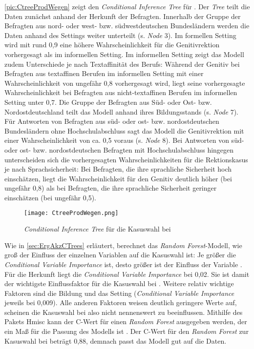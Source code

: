 \autoref{pic:CtreeProdWegen} zeigt den \textit{Conditional Inference Tree} für \wegen. 
Der \textit{Tree} teilt die Daten zunächst anhand der Herkunft der Befragten. 
Innerhalb der Gruppe der Befragten aus nord- oder west- bzw. südwestdeutschen Bundesländern werden die Daten anhand des Settings weiter unterteilt (s. \textit{Node} 3). 
Im formellen Setting wird mit rund 0,9 eine höhere Wahrscheinlichkeit für die Genitivrektion vorhergesagt als im informellen Setting. 
Im informellen Setting zeigt das Modell zudem Unterschiede je nach Textaffinität des Berufs:
Während der Genitiv bei Befragten aus textaffinen Berufen im informellen Setting mit einer Wahrscheinlichkeit von ungefähr 0,8 vorhergesagt wird, liegt seine vorhergesagte Wahrscheinlichkeit bei Befragten aus nicht-textaffinen Berufen im informellen Setting unter 0,7. 
Die Gruppe der Befragten aus Süd- oder Ost- bzw. Nordostdeutschland teilt das Modell anhand ihres Bildungsstands (s. \textit{Node} 7). 
Für Antworten von Befragten aus süd- oder ost- bzw. nordostdeutschen Bundesländern ohne Hochschulabschluss sagt das Modell die Genitivrektion mit einer Wahrscheinlichkeit von ca. 0,5 voraus (s. \textit{Node} 8). 
Bei Antworten von süd- oder ost- bzw. nordostdeutschen Befragten mit Hochschulabschluss hingegen unterscheiden sich die vorhergesagten Wahrscheinlichkeiten für die Rektionskasus je nach Sprachsicherheit:
Bei Befragten, die ihre sprachliche Sicherheit hoch einschätzen, liegt die Wahrscheinlichkeit für den Genitiv deutlich höher (bei ungefähr 0,8) als bei Befragten, die ihre sprachliche Sicherheit geringer einschätzen (bei ungefähr 0,5). 
\begin{figure}
\centering
\texttt{[image: CtreeProdWegen.png]}
\caption{\textit{Conditional Inference Tree} für die Kasuswahl bei \wegen}
\label{pic:CtreeProdWegen}
\end{figure}

Wie in \autoref{sec:ErgAkzCTrees} erläutert, berechnet das \textit{Random Forest}-Modell, wie groß der Einfluss der einzelnen Variablen auf die Kasuswahl ist:  
Je größer die \textit{Conditional Variable Importance} ist, desto größer ist der Einfluss der Variable \citep[s.][298--299]{Levshina.2015}. 
Für die Herkunft liegt die \textit{Conditional Variable Importance} bei 0,02. 
Sie ist damit der wichtigste Einflussfaktor für die Kasuswahl bei \wegen. 
Weitere relativ wichtige Faktoren sind die Bildung und das Setting (\textit{Conditional Variable Importance} jeweils bei 0,009). 
Alle anderen Faktoren weisen deutlich geringere Werte auf, scheinen die Kasuswahl bei \wegen{} also nicht nennenswert zu beeinflussen. 
Mithilfe des Pakets Hmisc \citep[][Version 4.4-0]{Harrell.2020} kann der C-Wert für einen \textit{Random Forest} ausgegeben werden, der ein Maß für die Passung des Modells ist \citep[s.][299]{Levshina.2015}. 
Der C-Wert für den \textit{Random Forest} zur Kasuswahl bei \wegen{} beträgt 0,88, demnach passt das Modell gut auf die Daten.  

